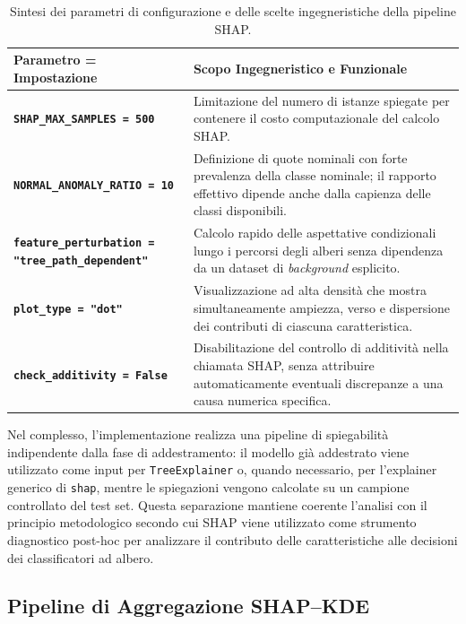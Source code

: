 \begin{table}[H]
    \centering
    \small
    \caption{Sintesi dei parametri di configurazione e delle scelte ingegneristiche della pipeline SHAP.}
    \label{tab:shap_config_parameters}
    \begin{tabularx}{\textwidth}{>{\raggedright\arraybackslash}p{6cm} >{\raggedright\arraybackslash}X}
        \toprule
        \textbf{Parametro = Impostazione} & \textbf{Scopo Ingegneristico e Funzionale} \\
        \midrule
        \textbf{\texttt{SHAP\_MAX\_SAMPLES = 500}} & 
        Limitazione del numero di istanze spiegate per contenere il costo computazionale del calcolo SHAP. \\
        \textbf{\texttt{NORMAL\_ANOMALY\_RATIO = 10}} & 
        Definizione di quote nominali con forte prevalenza della classe nominale; il rapporto effettivo dipende anche dalla capienza delle classi disponibili. \\
        \textbf{\texttt{feature\_perturbation = "tree\_path\_dependent"}} & 
        Calcolo rapido delle aspettative condizionali lungo i percorsi degli alberi senza dipendenza da un dataset di \textit{background} esplicito. \\
        \textbf{\texttt{plot\_type = "dot"}} & 
        Visualizzazione ad alta densità che mostra simultaneamente ampiezza, verso e dispersione dei contributi di ciascuna caratteristica. \\
        \textbf{\texttt{check\_additivity = False}} & 
        Disabilitazione del controllo di additività nella chiamata SHAP, senza attribuire automaticamente eventuali discrepanze a una causa numerica specifica. \\
        \bottomrule
    \end{tabularx}
\end{table}

Nel complesso, l'implementazione realizza una pipeline di spiegabilità indipendente dalla fase di addestramento: il modello già addestrato viene utilizzato come input per \texttt{TreeExplainer} o, quando necessario, per l'explainer generico di \texttt{shap}, mentre le spiegazioni vengono calcolate su un campione controllato del test set. 
Questa separazione mantiene coerente l'analisi con il principio metodologico secondo cui SHAP viene utilizzato come strumento diagnostico post-hoc per analizzare il contributo delle caratteristiche alle decisioni dei classificatori ad albero.

\subsection{Pipeline di Aggregazione SHAP--KDE}
\label{subsec:pipeline_shap_kde}

